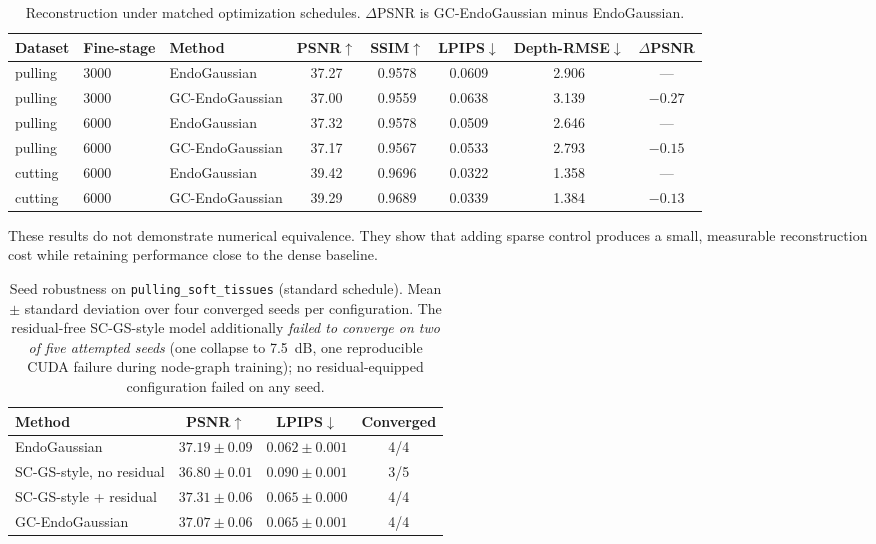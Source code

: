 \documentclass[AMA,Times1COL]{WileyNJDv5} %
\begin{document}
\begin{table}[t]%
\centering
\caption{Reconstruction under matched optimization schedules. $\Delta$PSNR is GC-EndoGaussian minus EndoGaussian.\label{tab:recon}}%
\begin{tabular*}{\textwidth}{@{\extracolsep\fill}lllccccc@{\extracolsep\fill}}
\toprule
\textbf{Dataset} & \textbf{Fine-stage} & \textbf{Method} & \textbf{PSNR}$\uparrow$ & \textbf{SSIM}$\uparrow$ & \textbf{LPIPS}$\downarrow$ & \textbf{Depth-RMSE}$\downarrow$ & \textbf{$\Delta$PSNR} \\
\midrule
pulling & 3000 & EndoGaussian     & 37.27 & 0.9578 & 0.0609 & 2.906 & --- \\
pulling & 3000 & GC-EndoGaussian  & 37.00 & 0.9559 & 0.0638 & 3.139 & $-0.27$ \\
pulling & 6000 & EndoGaussian     & 37.32 & 0.9578 & 0.0509 & 2.646 & --- \\
pulling & 6000 & GC-EndoGaussian  & 37.17 & 0.9567 & 0.0533 & 2.793 & $-0.15$ \\
cutting & 6000 & EndoGaussian     & 39.42 & 0.9696 & 0.0322 & 1.358 & --- \\
cutting & 6000 & GC-EndoGaussian  & 39.29 & 0.9689 & 0.0339 & 1.384 & $-0.13$ \\
\bottomrule
\end{tabular*}
\end{table}

These results do not demonstrate numerical equivalence. They show that adding sparse control produces a small, measurable reconstruction cost while retaining performance close to the dense baseline.

\begin{table}[t]%
\centering
\caption{Seed robustness on \texttt{pulling\_soft\_tissues} (standard schedule). Mean $\pm$ standard deviation over four converged seeds per configuration. The residual-free SC-GS-style model additionally \emph{failed to converge on two of five attempted seeds} (one collapse to 7.5~dB, one reproducible CUDA failure during node-graph training); no residual-equipped configuration failed on any seed.\label{tab:seeds}}%
\begin{tabular*}{\columnwidth}{@{\extracolsep\fill}lccc@{\extracolsep\fill}}
\toprule
\textbf{Method} & \textbf{PSNR}$\uparrow$ & \textbf{LPIPS}$\downarrow$ & \textbf{Converged} \\
\midrule
EndoGaussian             & $37.19 \pm 0.09$ & $0.062 \pm 0.001$ & 4/4 \\
SC-GS-style, no residual & $36.80 \pm 0.01$ & $0.090 \pm 0.001$ & 3/5 \\
SC-GS-style + residual   & $37.31 \pm 0.06$ & $0.065 \pm 0.000$ & 4/4 \\
GC-EndoGaussian          & $37.07 \pm 0.06$ & $0.065 \pm 0.001$ & 4/4 \\
\bottomrule
\end{tabular*}
\end{table}
\end{document}
